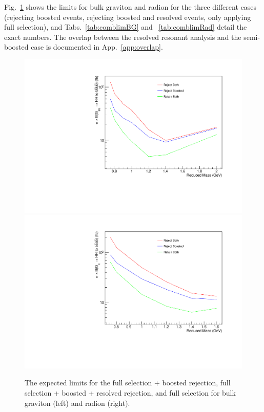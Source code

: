 Fig.~\ref{fig:combinedlimit} shows the limits for bulk graviton and radion for the three different cases (rejecting boosted events, rejecting boosted and resolved events, only applying full selection), and Tabs.~\ref{tab:comblimBG} and ~\ref{tab:comblimRad} detail the exact numbers. The overlap between the resolved resonant analysis and the semi-boosted case is documented in App.~\ref{app:overlap}.

\begin{figure}[thb!]
\begin{center}
\includegraphics[scale=0.35]{F5/BGLim_v5.pdf} 
\includegraphics[scale=0.35]{F5/RadLim_v5.pdf} 
\end{center}
\caption{The expected limits for the full selection + boosted rejection, full selection + boosted + resolved rejection, and full selection for bulk graviton (left) and radion (right).}
\label{fig:combinedlimit}
\end{figure} 

